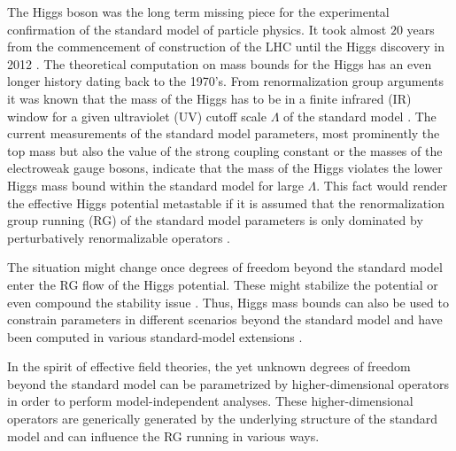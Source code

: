 \documentclass[twocolumn,aps,prd,showpacs,nofootinbib,superscriptaddress,preprintnumbers,floatfix,10pt]{revtex4-1}
\begin{document}
The Higgs boson was the long term missing piece for the experimental confirmation of the standard model of particle physics. It took almost $20$ years from the commencement of construction of the LHC until the Higgs discovery in 2012 \cite{Aad:2012tfa,Chatrchyan:2012xdj}. The theoretical computation on mass bounds for the Higgs has an even longer history dating back to the 1970's. From renormalization group arguments it was known that the mass of the Higgs has to be in a finite infrared (IR) window for a given ultraviolet (UV) cutoff scale $\Lambda$ of the standard model \cite{Krive:1976sg,Maiani:1977cg,Krasnikov:1978pu,Politzer:1978ic,Hung:1979dn,Linde:1979ny,Cabibbo:1979ay,Lindner:1985uk,Kuti:1987nr,Wetterich:1987az,Lindner:1988ww,Sher:1988mj,Arnold:1989cb,Arnold:1991cv,Ford:1992mv,Sher:1993mf,Altarelli:1994rb,Espinosa:1995se,Hambye:1996wb,Isidori:2001bm,Fodor:2007fn,Einhorn:2007rv,Ellis:2009tp,Djouadi:2009nu,Holthausen:2011aa}. 
The current measurements of the standard model parameters, most prominently the top mass but also the value of the strong coupling constant or the masses of the electroweak gauge bosons, indicate that the mass of the Higgs violates the lower Higgs mass bound within the standard model for large $\Lambda$. This fact would render the effective Higgs potential metastable if it is assumed that the renormalization group running (RG) of the standard model parameters is only dominated by perturbatively renormalizable operators \cite{Buttazzo:2013uya,Gabrielli:2013hma,Bednyakov:2015sca,Iacobellis:2016eof,Chigusa:2017dux}. 


The situation might change once degrees of freedom beyond the standard model enter the RG flow of the Higgs potential. These might stabilize the potential \cite{Hung:1995in,Casas:2000mn,Burgess:2001tj} or even compound the stability issue \cite{Loebbert:2015eea}. Thus, Higgs mass bounds can also be used to constrain parameters in different scenarios beyond the standard model and have been computed in various standard-model extensions \cite{Espinosa:1991gr,Casas:1994qy,Casas:1996aq,Bergerhoff:1999jj,Espinosa:2007qp,ArkaniHamed:2008ym,Kadastik:2011aa,EliasMiro:2011aa,Degrassi:2012ry,Lebedev:2012sy,Bezrukov:2012sa,EliasMiro:2012ay,Anchordoqui:2012fq,Lebedev:2012zw,Chen:2012faa,Masina:2012tz,Bezrukov:2014ina,Herranen:2014cua,Herranen:2015ima,Moss:2015gua,Okada:2015lia,Espinosa:2015zoa,Das:2015nwk,Das:2016zue,Abe:2016irv,Ema:2016ehh,Fischer:2016rsh,Branchina:2016bws,Bounakis:2017fkv}.


In the spirit of effective field theories, the yet unknown degrees of freedom beyond the standard model can be parametrized by higher-dimensional operators in order to perform model-independent analyses. These higher-dimensional operators are generically generated by the underlying structure of the standard model and can influence the RG running in various ways.
\end{document}
